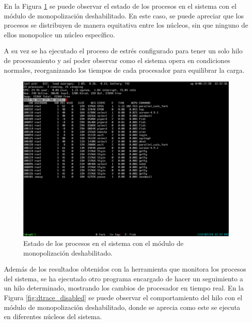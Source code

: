 En la Figura \ref{fig:top_disabled} se puede observar el estado de los procesos en el sistema con el módulo de monopolización deshabilitado. En este caso, se puede apreciar que los procesos se distribuyen de manera equitativa entre los núcleos, sin que ninguno de ellos monopolice un núcleo específico.\par

A su vez se ha ejecutado el proceso de estrés configurado para tener un solo hilo de procesamiento y así poder observar como el sistema opera en condiciones normales, reorganizando los tiempos de cada procesador para equilibrar la carga.\par

\begin{figure}[H]
    \centering
    \includegraphics[width=1\textwidth]{images/top_disabled.png}
    \caption{Estado de los procesos en el sistema con el módulo de monopolización deshabilitado.}
    \label{fig:top_disabled}
\end{figure}

Además de los resultados obtenidos con la herramienta que monitora los procesos del sistema, se ha ejecutado otro programa encargado de hacer un seguimiento a un hilo determinado, mostrando los cambios de procesador en tiempo real. En la Figura \ref{fig:dtrace_disabled} se puede observar el comportamiento del hilo con el módulo de monopolización deshabilitado, donde se aprecia como este se ejecuta en diferentes núcleos del sistema.\par


